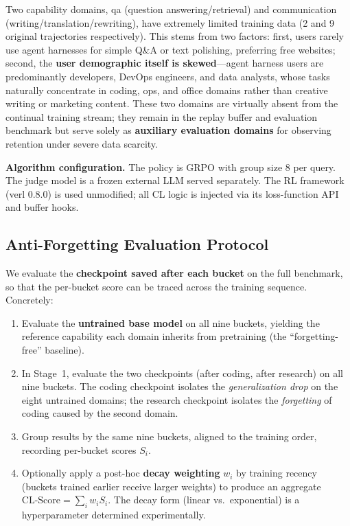 Two capability domains, qa (question answering/retrieval) and communication (writing/translation/rewriting), have extremely limited training data (2 and 9 original trajectories respectively). This stems from two factors: first, users rarely use agent harnesses for simple Q\&A or text polishing, preferring free websites; second, the \textbf{user demographic itself is skewed}---agent harness users are predominantly developers, DevOps engineers, and data analysts, whose tasks naturally concentrate in coding, ops, and office domains rather than creative writing or marketing content. These two domains are virtually absent from the continual training stream; they remain in the replay buffer and evaluation benchmark but serve solely as \textbf{auxiliary evaluation domains} for observing retention under severe data scarcity.

\textbf{Algorithm configuration.} The policy is GRPO with group size 8 per query. The judge model is a frozen external LLM served separately. The RL framework (verl 0.8.0) is used unmodified; all CL logic is injected via its loss-function API and buffer hooks.

\subsection{Anti-Forgetting Evaluation Protocol}

We evaluate the \textbf{checkpoint saved after each bucket} on the full benchmark, so that the per-bucket score can be traced across the training sequence. Concretely:

\begin{enumerate}
  \item Evaluate the \textbf{untrained base model} on all nine buckets, yielding the reference capability each domain inherits from pretraining (the ``forgetting-free'' baseline).
  \item In Stage~1, evaluate the two checkpoints (after coding, after research) on all nine buckets. The coding checkpoint isolates the \emph{generalization drop} on the eight untrained domains; the research checkpoint isolates the \emph{forgetting} of coding caused by the second domain.
  \item Group results by the same nine buckets, aligned to the training order, recording per-bucket scores $S_i$.
  \item Optionally apply a post-hoc \textbf{decay weighting} $w_i$ by training recency (buckets trained earlier receive larger weights) to produce an aggregate $\text{CL-Score}=\sum_i w_i S_i$. The decay form (linear vs.\ exponential) is a hyperparameter determined experimentally.
\end{enumerate}

